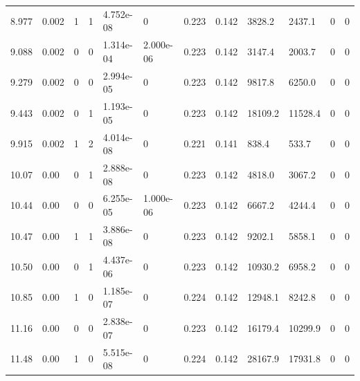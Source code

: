\documentclass[preview]{standalone}
\begin{document}
{{\begin{tabular}{L{1.2cm}C{1.2cm} C{0.3cm}C{0.5cm} C{1.4cm}C{1.4cm} C{1.4cm}C{1.4cm} C{1.6cm}C{1.6cm} C{1.6cm}C{1.6cm}}
  8.977  &  0.002  & 1     &  1 &  4.752e-08  & 0  &  0.223&   0.142& 3828.2 & 2437.1   &  0 & 0  \\ 
  9.088  &  0.002  & 0     &  0 &  1.314e-04  & 2.000e-06  &  0.223&   0.142& 3147.4 & 2003.7   &  0 & 0  \\ 
  9.279  &  0.002  & 0     &  0 &  2.994e-05  & 0  &  0.223&   0.142& 9817.8 & 6250.0   &  0 & 0  \\ 
  9.443  &  0.002  & 0     &  1 &  1.193e-05  & 0  &  0.223&   0.142& 18109.2 & 11528.4   &  0 & 0  \\ 
  9.915  &  0.002  & 1     &  2 &  4.014e-08  & 0  &  0.221&   0.141& 838.4 & 533.7   &  0 & 0  \\ 
  10.07  &  0.00  & 0     &  1 &  2.888e-08  & 0  &  0.223&   0.142& 4818.0 & 3067.2   &  0 & 0  \\ 
  10.44  &  0.00  & 0     &  0 &  6.255e-05  & 1.000e-06  &  0.223&   0.142& 6667.2 & 4244.4   &  0 & 0  \\ 
  10.47  &  0.00  & 1     &  1 &  3.886e-08  & 0  &  0.223&   0.142& 9202.1 & 5858.1   &  0 & 0  \\ 
  10.50  &  0.00  & 0     &  1 &  4.437e-06  & 0  &  0.223&   0.142& 10930.2 & 6958.2   &  0 & 0  \\ 
  10.85  &  0.00  & 1     &  0 &  1.185e-07  & 0  &  0.224&   0.142& 12948.1 & 8242.8   &  0 & 0  \\ 
  11.16  &  0.00  & 0     &  0 &  2.838e-07  & 0  &  0.223&   0.142& 16179.4 & 10299.9   &  0 & 0  \\ 
  11.48  &  0.00  & 1     &  0 &  5.515e-08  & 0  &  0.224&   0.142& 28167.9 & 17931.8   &  0 & 0  \\ 
\hline 
\end{tabular} 

}}
\end{document}
